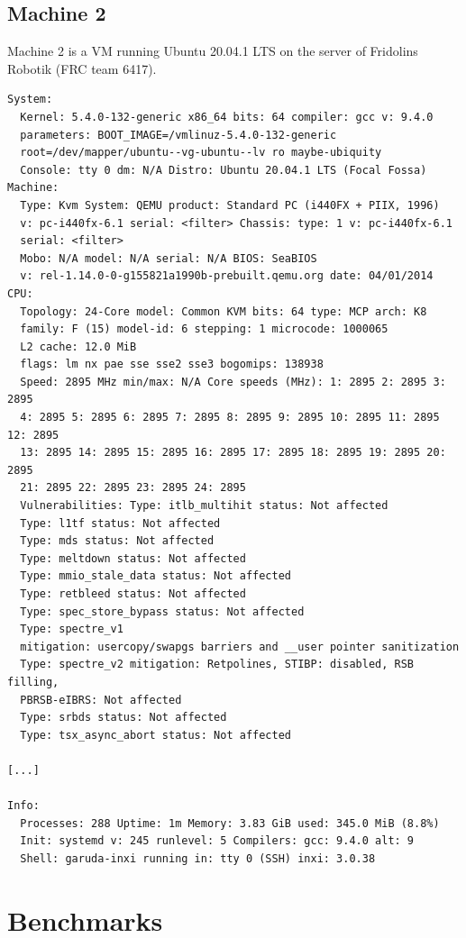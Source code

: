 \documentclass[11pt,DIV=10,final]{scrreprt} %
\begin{document}
{\begin{appendix}
\subsection{Machine 2}\label{specs:m2}
Machine 2 is a VM running Ubuntu 20.04.1 LTS on the server of Fridolins Robotik (FRC team 6417).
\begin{verbatim}
System:
  Kernel: 5.4.0-132-generic x86_64 bits: 64 compiler: gcc v: 9.4.0
  parameters: BOOT_IMAGE=/vmlinuz-5.4.0-132-generic
  root=/dev/mapper/ubuntu--vg-ubuntu--lv ro maybe-ubiquity
  Console: tty 0 dm: N/A Distro: Ubuntu 20.04.1 LTS (Focal Fossa)
Machine:
  Type: Kvm System: QEMU product: Standard PC (i440FX + PIIX, 1996)
  v: pc-i440fx-6.1 serial: <filter> Chassis: type: 1 v: pc-i440fx-6.1
  serial: <filter>
  Mobo: N/A model: N/A serial: N/A BIOS: SeaBIOS
  v: rel-1.14.0-0-g155821a1990b-prebuilt.qemu.org date: 04/01/2014
CPU:
  Topology: 24-Core model: Common KVM bits: 64 type: MCP arch: K8
  family: F (15) model-id: 6 stepping: 1 microcode: 1000065
  L2 cache: 12.0 MiB
  flags: lm nx pae sse sse2 sse3 bogomips: 138938
  Speed: 2895 MHz min/max: N/A Core speeds (MHz): 1: 2895 2: 2895 3: 2895
  4: 2895 5: 2895 6: 2895 7: 2895 8: 2895 9: 2895 10: 2895 11: 2895 12: 2895
  13: 2895 14: 2895 15: 2895 16: 2895 17: 2895 18: 2895 19: 2895 20: 2895
  21: 2895 22: 2895 23: 2895 24: 2895
  Vulnerabilities: Type: itlb_multihit status: Not affected
  Type: l1tf status: Not affected
  Type: mds status: Not affected
  Type: meltdown status: Not affected
  Type: mmio_stale_data status: Not affected
  Type: retbleed status: Not affected
  Type: spec_store_bypass status: Not affected
  Type: spectre_v1
  mitigation: usercopy/swapgs barriers and __user pointer sanitization
  Type: spectre_v2 mitigation: Retpolines, STIBP: disabled, RSB filling,
  PBRSB-eIBRS: Not affected
  Type: srbds status: Not affected
  Type: tsx_async_abort status: Not affected

[...]

Info:
  Processes: 288 Uptime: 1m Memory: 3.83 GiB used: 345.0 MiB (8.8%)
  Init: systemd v: 245 runlevel: 5 Compilers: gcc: 9.4.0 alt: 9
  Shell: garuda-inxi running in: tty 0 (SSH) inxi: 3.0.38
\end{verbatim}

\section{Benchmarks}\label{sec:app:benchmarks}

\end{appendix}}
\end{document}
